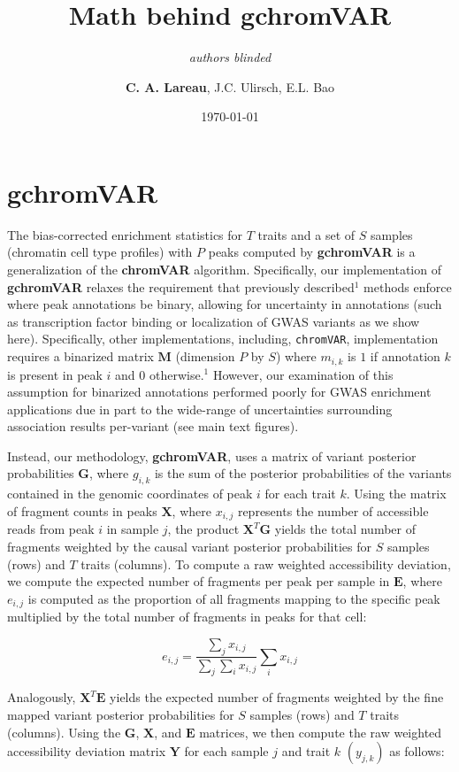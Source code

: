 \documentclass{article}\usepackage[]{graphicx}\usepackage[]{color}
\title{Math behind \textbf{gchromVAR}}
\author{\textit{authors blinded}}
\author{\textbf{C. A. Lareau}, J.C. Ulirsch, E.L. Bao}
\date{\today}
\begin{document}
\maketitle

\section*{gchromVAR}
The bias-corrected enrichment statistics for $T$ traits and a set of $S$ samples (chromatin cell type profiles) with $P$ peaks computed by \textbf{gchromVAR} is a generalization of the \textbf{chromVAR} algorithm. Specifically, our implementation of \textbf{gchromVAR} relaxes the requirement that previously described$^{1}$ methods enforce where peak annotations be binary, allowing for uncertainty in annotations (such as transcription factor binding or localization of GWAS variants as we show here). Specifically, other implementations, including, \texttt{chromVAR}, implementation requires a binarized matrix $\boldsymbol{M}$ (dimension $P$ by $S$) where $m_{i,k}$ is $1$ if annotation $k$ is present in peak $i$ and $0$ otherwise.$^1$ However, our examination of this assumption for binarized annotations performed poorly for GWAS enrichment applications due in part to the wide-range of uncertainties surrounding association results per-variant (see main text figures). \newline

\noindent Instead, our methodology, \textbf{gchromVAR}, uses a matrix of variant posterior probabilities $\boldsymbol{G}$, where $g_{i,k}$ is the sum of the posterior probabilities of the variants contained in the genomic coordinates of peak $i$ for each trait $k$. Using the matrix of fragment counts in peaks $\boldsymbol{X}$, where $x_{i,j}$ represents the number of accessible reads from peak $i$ in sample $j$, the product $\boldsymbol{X}^T\boldsymbol{G}$ yields the total number of fragments weighted by the causal variant posterior probabilities for $S$ samples (rows) and $T$ traits (columns). To compute a raw weighted accessibility deviation, we compute the expected number of fragments per peak per sample in $\boldsymbol{E}$, where $e_{i,j}$  is computed as the proportion of all fragments mapping to the specific peak multiplied by the total number of fragments in peaks for that cell: 

$$ e_{i,j} = \frac{\sum_jx_{i,j}}{\sum_j\sum_ix_{i,j}} \sum_ix_{i,j}$$

\noindent Analogously, $\boldsymbol{X}^T\boldsymbol{E}$ yields the expected number of fragments weighted by the fine mapped variant posterior probabilities for $S$ samples (rows) and $T$ traits (columns). Using the $\boldsymbol{G}$,  $\boldsymbol{X}$, and  $\boldsymbol{E}$ matrices, we then compute the raw weighted accessibility deviation matrix $\boldsymbol{Y}$ for each sample $j$ and trait $k$ $(y_{j,k})$ as follows:
\end{document}

